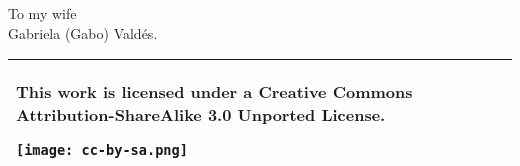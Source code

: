 \documentclass{usm-thesis}
\begin{document}



\pagestyle{empty}
\chapter*{}
\vspace{12cm}
\begin{flushright}
 {\LARGE To my wife }\\ Gabriela (Gabo) Vald\'es. 
\end{flushright}

\newpage
{}
\begin{tabular}{|p{}|}
 \hline
 This work is licensed under a Creative Commons Attribution-ShareAlike 3.0 Unported License.
 \begin{center}
 \texttt{[image: cc-by-sa.png]}
 \end{center}\\
 \hline
 \end{tabular}

\frontmatter
\pagestyle{special}

\tableofcontents



%



\mainmatter
\pagestyle{main}










\backmatter


\nocite{IAS1,IAS2,Gilmore,Curtis,Bertlmann,Arnold,Freed, Nakahara,SUGRA-book,WeinbergQFT1,WeinbergQFT2,WeinbergQFT3,CCSZ}



\end{document}
